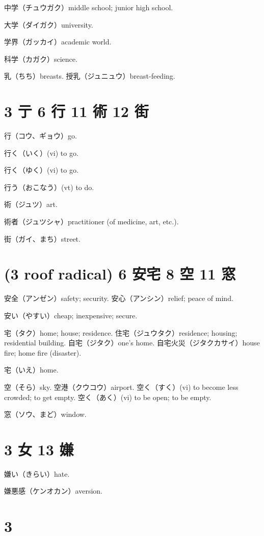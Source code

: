 中学（チュウガク）middle school; junior high school.

大学（ダイガク）university.

学界（ガッカイ）academic world.

科学（カガク）science.

乳（ちち）breasts.
授乳（ジュニュウ）breast-feeding.

\section{3 亍 6 行 11 術 12 街}

行（コウ、ギョウ）go.

行く（いく）(vi) to go.

行く（ゆく）(vi) to go.

行う（おこなう）(vt) to do.

術（ジュツ）art.

術者（ジュツシャ）practitioner (of medicine, art, etc.).

街（ガイ、まち）street.

\section{(3 roof radical) 6 安宅 8 空 11 窓}

安全（アンゼン）safety; security.
安心（アンシン）relief; peace of mind.

安い（やすい）cheap; inexpensive; secure.

宅（タク）home; house; residence.
住宅（ジュウタク）residence; housing; residential building.
自宅（ジタク）one's home.
自宅火災（ジタクカサイ）house fire; home fire (disaster).

宅（いえ）home.

空（そら）sky.
空港（クウコウ）airport.
空く（すく）(vi) to become less crowded; to get empty.
空く（あく）(vi) to be open; to be empty.

窓（ソウ、まど）window.

\section{3 女 13 嫌}

嫌い（きらい）hate.

嫌悪感（ケンオカン）aversion.

\section{3 𠫔}

